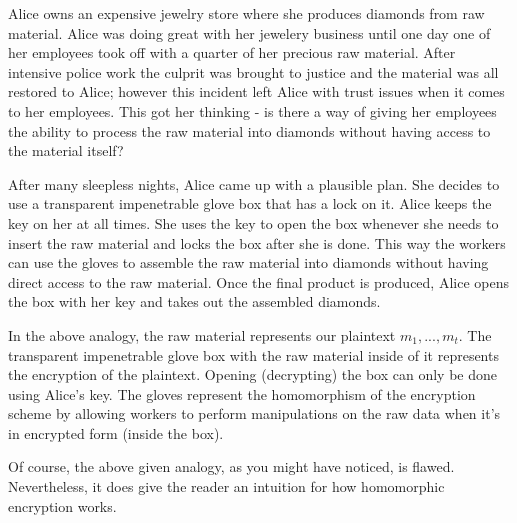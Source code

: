 \documentclass[../../main.tex]{subfiles}
\begin{document}
Alice owns an expensive jewelry store where she produces diamonds from raw material. Alice was doing great with her jewelery business until one day one of her employees took off with a quarter of her precious raw material. After intensive police work the culprit was brought to justice and the material was all restored to Alice; however this incident left Alice with trust issues when it comes to her employees. This got her thinking - is there a way of giving her employees the ability to process the raw material into diamonds without having access to the material itself?

After many sleepless nights, Alice came up with a plausible plan. She decides to use a transparent impenetrable glove box that has a lock on it. Alice keeps the key on her at all times. She uses the key to open the box whenever she needs to insert the raw material and locks the box after she is done. This way the workers can use the gloves to assemble the raw material into diamonds without having direct access to the raw material. Once the final product is produced, Alice opens the box with her key and takes out the assembled diamonds.

In the above analogy, the raw material represents our plaintext $m_1,...,m_t$. The transparent impenetrable glove box with the raw material inside of it represents the encryption of the plaintext. Opening (decrypting) the box can only be done using Alice's key. The gloves represent the homomorphism of the encryption scheme by allowing workers to perform manipulations on the raw data when it's in encrypted form (inside the box).

Of course, the above given analogy, as you might have noticed, is flawed. Nevertheless, it does give the reader an intuition for how homomorphic encryption works.
\end{document}
